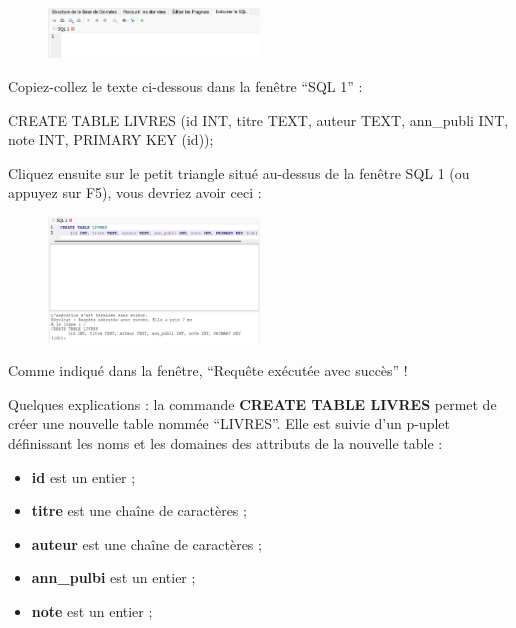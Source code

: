 \documentclass[
  a4paper,
  DIV=11,
  numbers=noendperiod]{scrartcl}
\newenvironment{Shaded}{\begin{snugshade}}{\end{snugshade}}
\newcommand{\DataTypeTok}[1]{\textcolor[rgb]{0.68,0.00,0.00}{#1}}
\newcommand{\KeywordTok}[1]{\textcolor[rgb]{0.00,0.23,0.31}{#1}}
\newcommand{\NormalTok}[1]{\textcolor[rgb]{0.00,0.23,0.31}{#1}}
\providecommand{\tightlist}{%
  \setlength{\itemsep}{0pt}\setlength{\parskip}{0pt}}\usepackage{longtable,booktabs,array}
\begin{document}
\begin{enumerate}
\begin{figure}
  {\centering \includegraphics[width=0.5\textwidth,height=\textheight]{TP1_3.png}

  }

  \end{figure}

  Copiez-collez le texte ci-dessous dans la fenêtre ``SQL 1'' :

\begin{Shaded}
\begin{Highlighting}[]
\KeywordTok{CREATE} \KeywordTok{TABLE}\NormalTok{ LIVRES}
\NormalTok{    (}\KeywordTok{id} \DataTypeTok{INT}\NormalTok{, titre TEXT, auteur TEXT, ann\_publi }\DataTypeTok{INT}\NormalTok{, note }\DataTypeTok{INT}\NormalTok{, }\KeywordTok{PRIMARY} \KeywordTok{KEY}\NormalTok{ (}\KeywordTok{id}\NormalTok{));}
\end{Highlighting}
\end{Shaded}

  Cliquez ensuite sur le petit triangle situé au-dessus de la fenêtre
  SQL 1 (ou appuyez sur F5), vous devriez avoir ceci :

  \begin{figure}

  {\centering \includegraphics[width=0.5\textwidth,height=\textheight]{TP1_4.png}

  }

  \end{figure}

  Comme indiqué dans la fenêtre, ``Requête exécutée avec succès'' !

  Quelques explications : la commande \textbf{CREATE TABLE LIVRES}
  permet de créer une nouvelle table nommée ``LIVRES''. Elle est suivie
  d'un p-uplet définissant les noms et les domaines des attributs de la
  nouvelle table :

  \begin{itemize}
  \tightlist
  \item
    \textbf{id} est un entier ;
  \item
    \textbf{titre} est une chaîne de caractères ;
  \item
    \textbf{auteur} est une chaîne de caractères ;
  \item
    \textbf{ann\_pulbi} est un entier ;
  \item
    \textbf{note} est un entier ;
  \end{itemize}


\end{enumerate}
\end{document}
